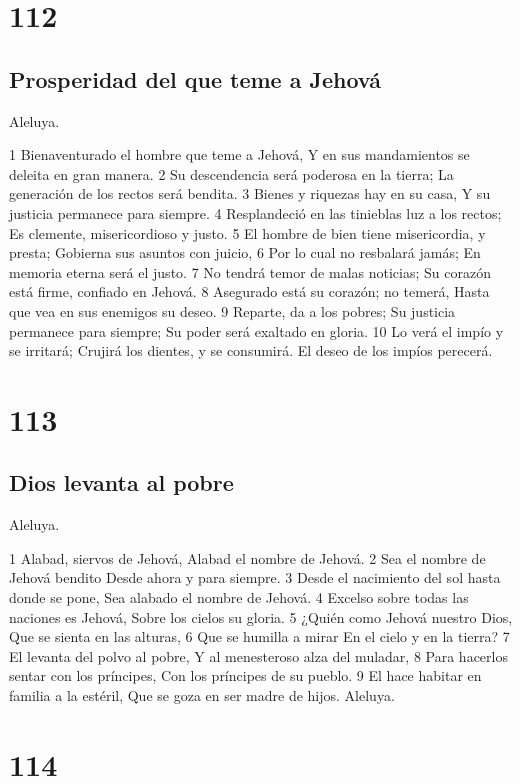 \chapter{112}

\section*{Prosperidad del que teme a Jehová}

Aleluya.

1 Bienaventurado el hombre que teme a Jehová,
Y en sus mandamientos se deleita en gran manera.
2 Su descendencia será poderosa en la tierra;
La generación de los rectos será bendita.
3 Bienes y riquezas hay en su casa,
Y su justicia permanece para siempre.
4 Resplandeció en las tinieblas luz a los rectos;
Es clemente, misericordioso y justo.
5 El hombre de bien tiene misericordia, y presta;
Gobierna sus asuntos con juicio,
6 Por lo cual no resbalará jamás;
En memoria eterna será el justo.
7 No tendrá temor de malas noticias;
Su corazón está firme, confiado en Jehová.
8 Asegurado está su corazón; no temerá,
Hasta que vea en sus enemigos su deseo.
9 Reparte, da a los pobres;
Su justicia permanece para siempre;
Su poder será exaltado en gloria.
10 Lo verá el impío y se irritará;
Crujirá los dientes, y se consumirá.
El deseo de los impíos perecerá.

\chapter{113}

\section*{Dios levanta al pobre}

Aleluya.

1 Alabad, siervos de Jehová,
Alabad el nombre de Jehová.
2 Sea el nombre de Jehová bendito
Desde ahora y para siempre.
3 Desde el nacimiento del sol hasta donde se pone,
Sea alabado el nombre de Jehová.
4 Excelso sobre todas las naciones es Jehová,
Sobre los cielos su gloria.
5 ¿Quién como Jehová nuestro Dios,
Que se sienta en las alturas,
6 Que se humilla a mirar
En el cielo y en la tierra?
7 El levanta del polvo al pobre,
Y al menesteroso alza del muladar,
8 Para hacerlos sentar con los príncipes,
Con los príncipes de su pueblo.
9 El hace habitar en familia a la estéril,
Que se goza en ser madre de hijos.
Aleluya.

\chapter{114}

